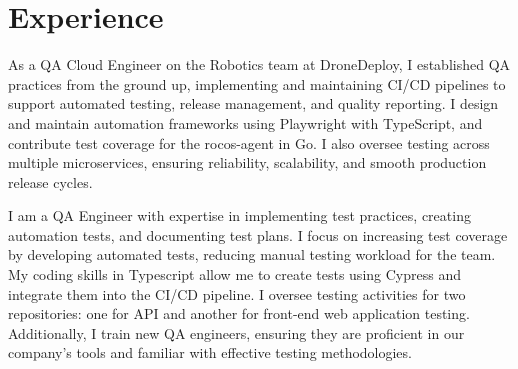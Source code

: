 \documentclass[a4paper]{deedy-resume} %
\begin{document}
\hfill
%
%
\begin{minipage}[t]{0.66\textwidth} %


\section{Experience}


\vspace{\topsep} %
\begin{tightitemize}
\item As a QA Cloud Engineer on the Robotics team at DroneDeploy, I established QA practices from the ground up, implementing and maintaining CI/CD pipelines to support automated testing, release management, and quality reporting. I design and maintain automation frameworks using Playwright with TypeScript, and contribute test coverage for the rocos-agent in Go. I also oversee testing across multiple microservices, ensuring reliability, scalability, and smooth production release cycles. 

\end{tightitemize}
\sectionspace %


\begin{tightitemize}
\item I am a QA Engineer with expertise in implementing test practices, creating automation tests, and documenting test plans. I focus on increasing test coverage by developing automated tests, reducing manual testing workload for the team. My coding skills in Typescript allow me to create tests using Cypress and integrate them into the CI/CD pipeline. I oversee testing activities for two repositories: one for API and another for front-end web application testing. \linebreak Additionally, I train new QA engineers, ensuring they are proficient in our company's tools and familiar with effective testing methodologies.


\end{tightitemize}
\end{minipage}
\end{document}
